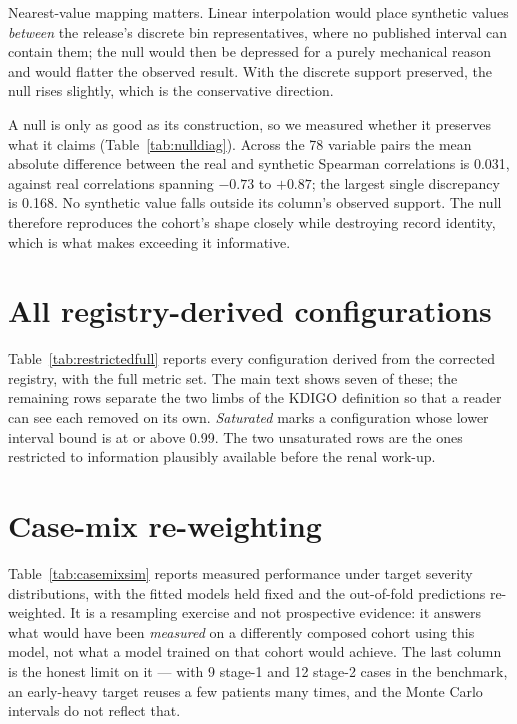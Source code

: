 \documentclass[conference]{IEEEtran}
\begin{document}
Nearest-value mapping matters. Linear interpolation would place synthetic
values \emph{between} the release's discrete bin representatives, where no
published interval can contain them; the null would then be depressed for a
purely mechanical reason and would flatter the observed result. With the
discrete support preserved, the null rises slightly, which is the
conservative direction.

A null is only as good as its construction, so we measured whether it
preserves what it claims (Table~\ref{tab:nulldiag}). Across the 78 variable
pairs the mean absolute difference between the real and synthetic Spearman
correlations is 0.031, against real correlations spanning $-0.73$ to $+0.87$;
the largest single discrepancy is 0.168. No synthetic value falls outside its
column's observed support. The null therefore reproduces the cohort's shape
closely while destroying record identity, which is what makes exceeding it
informative.



\section{All registry-derived configurations}

Table~\ref{tab:restrictedfull} reports every configuration derived from the
corrected registry, with the full metric set. The main text shows seven of
these; the remaining rows separate the two limbs of the KDIGO definition so
that a reader can see each removed on its own. \emph{Saturated} marks a
configuration whose lower interval bound is at or above 0.99. The two
unsaturated rows are the ones restricted to information plausibly available
before the renal work-up.



\section{Case-mix re-weighting}

Table~\ref{tab:casemixsim} reports measured performance under target severity
distributions, with the fitted models held fixed and the out-of-fold
predictions re-weighted. It is a resampling exercise and not prospective
evidence: it answers what would have been \emph{measured} on a differently
composed cohort using this model, not what a model trained on that cohort
would achieve. The last column is the honest limit on it --- with 9 stage-1
and 12 stage-2 cases in the benchmark, an early-heavy target reuses a few
patients many times, and the Monte Carlo intervals do not reflect that.
\end{document}
